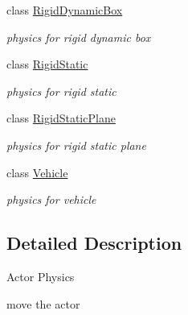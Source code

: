\begin{DoxyCompactItemize}
class \hyperlink{classContent_1_1Actor_1_1Physics_1_1RigidDynamicBox}{RigidDynamicBox}
\begin{DoxyCompactList}\small\item\em physics for rigid dynamic box \item\end{DoxyCompactList}\item 
class \hyperlink{classContent_1_1Actor_1_1Physics_1_1RigidStatic}{RigidStatic}
\begin{DoxyCompactList}\small\item\em physics for rigid static \item\end{DoxyCompactList}\item 
class \hyperlink{classContent_1_1Actor_1_1Physics_1_1RigidStaticPlane}{RigidStaticPlane}
\begin{DoxyCompactList}\small\item\em physics for rigid static plane \item\end{DoxyCompactList}\item 
class \hyperlink{classContent_1_1Actor_1_1Physics_1_1Vehicle}{Vehicle}
\begin{DoxyCompactList}\small\item\em physics for vehicle \item\end{DoxyCompactList}\end{DoxyCompactItemize}


\subsection{Detailed Description}
Actor Physics 
\begin{DoxyItemize}
\item move the actor 
\end{DoxyItemize}
